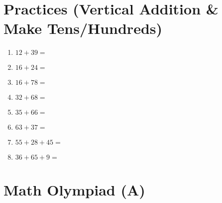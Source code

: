 \documentclass[a4paper,12pt]{article}
\begin{document}
\newpage
\section*{\large \center\textbf{Practices (Vertical Addition \& Make Tens/Hundreds)}}
\vspace{1 cm}
\begin{multicols}{2}
\begin{enumerate}[label=\arabic*.]
    \item \textbf{\Large $12 + 39 =$} \underline{\hspace{2cm}} \vspace{4.5cm}
    \item \textbf{\Large $16 + 24 =$} \underline{\hspace{2cm}} \vspace{4.5cm}
    \item \textbf{\Large $16 + 78 =$} \underline{\hspace{2cm}} \vspace{4.5cm}
    \item \textbf{\Large $32 + 68 =$} \underline{\hspace{2cm}} \vspace{4.5cm}
    \item \textbf{\Large $35 + 66 =$} \underline{\hspace{2cm}} \vspace{4.5cm}
    \item \textbf{\Large $63 + 37 =$} \underline{\hspace{2cm}} \vspace{4.5cm}
    \item \textbf{\Large $55 + 28 + 45 =$} \underline{\hspace{2cm}} \vspace{4.5cm}
    \item \textbf{\Large $36 + 65 + 9 =$} \underline{\hspace{2cm}} \vspace{4.5cm}
\end{enumerate}
\end{multicols}


\newpage
\section*{\huge \center\textbf{Math Olympiad (A)}}
\vspace{1 cm}
\renewcommand{\arraystretch}{2} %
\setlength{\extrarowheight}{5pt} %
\end{document}
